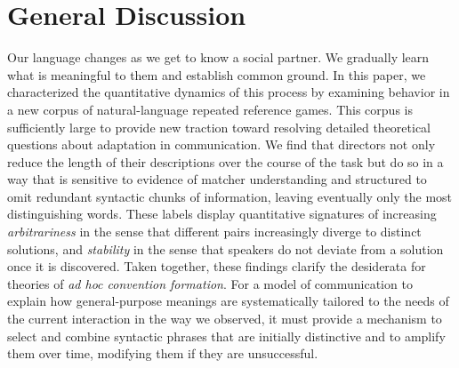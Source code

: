 \documentclass[alpha-refs]{wiley-article}
\begin{document}
\section{General Discussion}
\label{sec:discussion}

Our language changes as we get to know a social partner.
We gradually learn what is meaningful to them and establish common ground.
In this paper, we characterized the quantitative dynamics of this process by examining behavior in a new corpus of natural-language repeated reference games.
This corpus is sufficiently large to provide new traction toward resolving detailed theoretical questions about adaptation in communication.
We find that directors not only reduce the length of their descriptions over the course of the task but do so in a way that is sensitive to evidence of matcher understanding and structured to omit redundant syntactic chunks of information, leaving eventually only the most distinguishing words.
These labels display quantitative signatures of increasing \emph{arbitrariness} in the sense that different pairs increasingly diverge to distinct solutions, and \emph{stability} in the sense that speakers do not deviate from a solution once it is discovered.
Taken together, these findings clarify the desiderata for theories of \emph{ad hoc convention formation}.
For a model of communication to explain how general-purpose meanings are systematically tailored to the needs of the current interaction in the way we observed, it must provide a mechanism to select and combine syntactic phrases that are initially distinctive and to amplify them over time, modifying them if they are unsuccessful.
\end{document}
